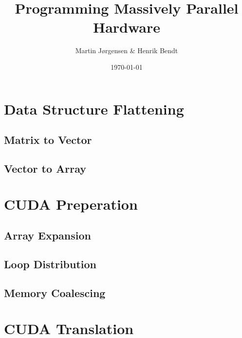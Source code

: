 \documentclass{beamer}
\begin{document}
\title{Programming Massively Parallel Hardware} 
\author{
    Martin Jørgensen \& Henrik Bendt
} 
\date{\today} 

\frame{\titlepage} 



\section{Data Structure Flattening}

\subsection{Matrix to Vector}

\subsection{Vector to Array}


\section{CUDA Preperation}
\subsection{Array Expansion}

\subsection{Loop Distribution}

\subsection{Memory Coalescing}



\section{CUDA Translation}

\end{document}
